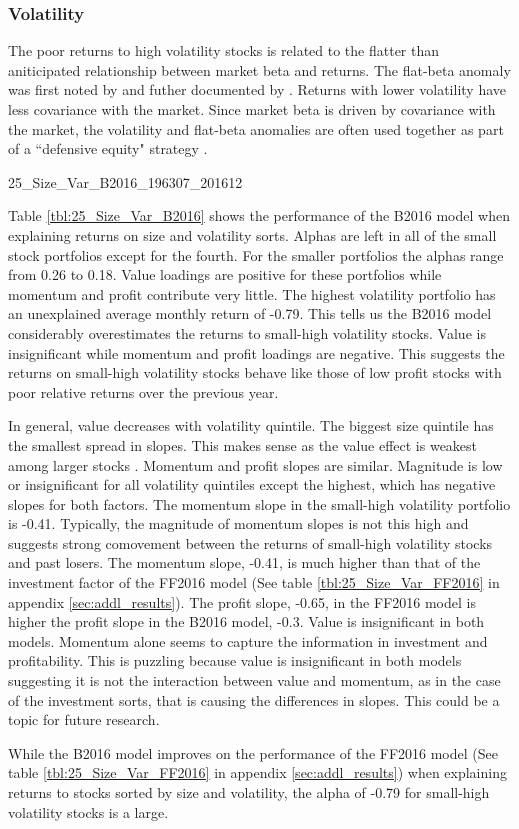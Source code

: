 
\subsubsection{Volatility}

The poor returns to high volatility stocks is related to the flatter than aniticipated
relationship between market beta and returns. The flat-beta anomaly was first noted by
\textcite{jensen1972capital} and futher documented by \textcite{fama1973risk}. Returns
with lower volatility have less covariance with the market. Since market beta is driven by
covariance with the market, the volatility and flat-beta anomalies are often used together
as part of a ``defensive equity" strategy \parencite{frazzini2014betting}.

{25_Size_Var_B2016_196307_201612}

Table \ref{tbl:25_Size_Var_B2016} shows the performance of the B2016 model when
explaining returns on size and volatility sorts. Alphas are left in all of the small stock
portfolios except for the fourth. For the smaller portfolios the alphas range from 0.26 to
0.18. Value loadings are positive for these portfolios while momentum and profit
contribute very little. The highest volatility portfolio has an unexplained average
monthly return of -0.79. This tells us the B2016 model considerably overestimates the
returns to small-high volatility stocks. Value is insignificant while momentum and profit
loadings are negative. This suggests the returns on small-high volatility stocks behave
like those of low profit stocks with poor relative returns over the previous year.

In general, value decreases with volatility quintile. The biggest size quintile has the
smallest spread in slopes. This makes sense as the value effect is weakest among larger
stocks \parencite{asness2015fact}. Momentum and profit slopes are similar. Magnitude is
low or insignificant for all volatility quintiles except the highest, which has negative
slopes for both factors. The momentum slope in the small-high volatility portfolio is
-0.41. Typically, the magnitude of momentum slopes is not this high and suggests strong
comovement between the returns of small-high volatility stocks and past losers. The
momentum slope, -0.41, is much higher than that of the investment factor of the FF2016
model (See table \ref{tbl:25_Size_Var_FF2016} in appendix \ref{sec:addl_results}). The
profit slope, -0.65, in the FF2016 model is higher the profit slope in the B2016 model,
-0.3. Value is insignificant in both models. Momentum alone seems to capture the
information in investment and profitability. This is puzzling because value is
insignificant in both models suggesting it is not the interaction between value and
momentum, as in the case of the investment sorts, that is causing the differences in
slopes. This could be a topic for future research.

While the B2016 model improves on the performance of the FF2016 model (See table
\ref{tbl:25_Size_Var_FF2016} in appendix \ref{sec:addl_results}) when explaining returns
to stocks sorted by size and volatility, the alpha of -0.79 for small-high volatility
stocks is a large.